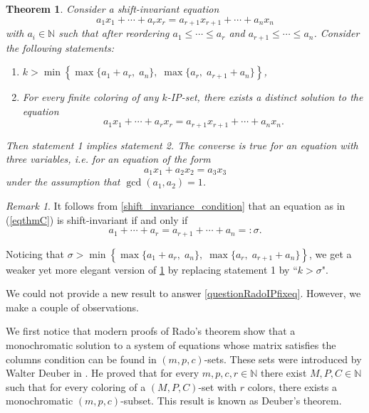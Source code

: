 \documentclass{article}
\theoremstyle{definition}
\theoremstyle{plain}
\newtheorem{maintheorem}{Theorem}
\theoremstyle{remark}
\newtheorem{remark}{Remark}[section]
\newcommand{\N}{\ensuremath{\mathbb{N}}}
\begin{document}
\begin{maintheorem}\label{INTRO_suff_signature_kIP}
    Consider a shift-invariant equation
     \begin{equation}\label{eqthmC}
        a_1 x_1 + \cdots + a_r x_r = a_{r+1} x_{r+1} + \cdots + a_n x_n
    \end{equation}
     with $a_i \in \N$ such that after reordering $a_1 \leq \cdots \leq a_r$ and $a_{r+1} \leq \cdots \leq a_n$.
    Consider the following statements:
    \begin{enumerate}
        \item $k > \min \left \{ \max\{a_1 + a_r, \; a_n\},\; \max\{a_r,\; a_{r+1} + a_n\} \right \}$,
        \item For every finite coloring of any $k$-IP-set, there exists a distinct solution to the equation 
        $$a_1 x_1 + \cdots + a_r x_r = a_{r+1} x_{r+1} + \cdots + a_n x_n.$$
    \end{enumerate}

    Then statement 1 implies statement 2. The converse is true for an equation with three variables, i.e. for an equation of the form 
    $$a_1 x_1 + a_2 x_2 = a_3 x_3$$
    under the assumption that $\gcd(a_1, a_2) = 1$.
\end{maintheorem}
\begin{remark}
    It follows from \cref{shift_invariance_condition} that an equation as in (\ref{eqthmC}) is shift-invariant if and only if 
    $$a_1 + \cdots + a_r = a_{r+1} + \cdots + a_n = :  \sigma.$$
    
    Noticing that $\sigma > \min \left \{ \max\{a_1 + a_r, \; a_n\},\; \max\{a_r,\; a_{r+1} + a_n\} \right \}$, we get a weaker yet more elegant version of \cref{INTRO_suff_signature_kIP} by replacing statement 1 by “$k > \sigma$".\\
\end{remark}

We could not provide a new result to answer \cref{questionRadoIPfixeq}. However, we make a couple of observations.

We first notice that modern proofs of Rado's theorem show that a monochromatic solution to a system of equations whose matrix satisfies the columns condition can be found in $(m,p,c)$-sets. These sets were introduced by Walter Deuber in \cite{Deu73}. He proved that for every $m,p,c,r \in \N$ there exist $M,P,C \in \N$ such that for every coloring of a $(M,P,C)$-set with $r$ colors, there exists a monochromatic $(m,p,c)$-subset. This result is known as Deuber's theorem.
\end{document}
